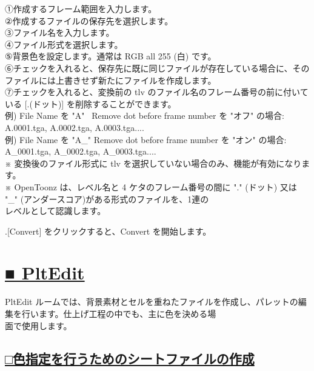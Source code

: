 \documentclass[a4paper,10pt]{article}
\begin{document}
\footnotesize
\noindent ①作成するフレーム範囲を入力します。\\
②作成するファイルの保存先を選択します。\\
③ファイル名を入力します。\\
④ファイル形式を選択します。\\
⑤背景色を設定します。通常は RGB all 255 (白) です。\\
⑥チェックを入れると、保存先に既に同じファイルが存在している場合に、そのファイルには上書きせず新たにファイルを作成します。\\
⑦チェックを入れると、変換前の tlv のファイル名のフレーム番号の前に付いている [.(ドット)] を削除することができます。\\
例) File Name を "A"  \ Remove dot before frame number を "オフ" の場合: A.0001.tga, A.0002.tga, A.0003.tga....\\
例) File Name を "A\_"  Remove dot before frame number を "オン" の場合: A\_0001.tga, A\_0002.tga, A\_0003.tga....\\
※ 変換後のファイル形式に tlv を選択していない場合のみ、機能が有効になります。\\
※ OpenToonz は、レベル名と 4 ケタのフレーム番号の間に "." (ドット) 又は "\_"  (アンダースコア)がある形式のファイルを、1連の\\
レベルとして認識します。\\
\par
\normalsize
{}.[Convert] をクリックすると、Convert を開始します。

\newpage

\section*{\uline{■ PltEdit}}

\footnotesize
\noindent PltEdit ルームでは、背景素材とセルを重ねたファイルを作成し、パレットの編集を行います。仕上げ工程の中でも、主に色を決める場\\
面で使用します。\\

\subsection*{\uline{□色指定を行うためのシートファイルの作成}}
\end{document}
